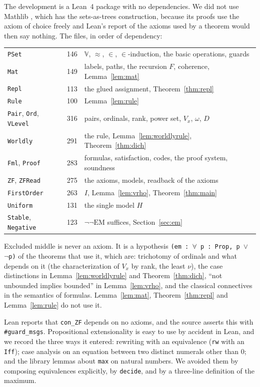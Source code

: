 \documentclass[10pt]{article}
\theoremstyle{definition}
\theoremstyle{remark}
\newcommand{\EM}{\mathrm{EM}}
\newcommand{\V}{\mathbb{V}}
\newcommand{\lean}[1]{\texttt{#1}}
\begin{document}
The development is a Lean~4 package with no dependencies. We did not
use Mathlib \cite{mathlib}, which has the sets-as-trees construction,
because its proofs use the axiom of choice freely and Lean's report of
the axioms used by a theorem would then say nothing. The files, in order
of dependency:
\begin{center}
\begin{tabular}{lrl}
\lean{PSet} & 146 & $\V$, $\approx$, $\in$, $\in$-induction, the basic operations, guards\\
\lean{Mat} & 149 & labels, paths, the recursion $F$, coherence, Lemma~\ref{lem:mat}\\
\lean{Repl} & 113 & the glued assignment, Theorem~\ref{thm:repl}\\
\lean{Rule} & 100 & Lemma~\ref{lem:rule}\\
\lean{Pair}, \lean{Ord}, \lean{VLevel} & 316 & pairs, ordinals, rank, power set, $V_x$, $\omega$, $D$\\
\lean{Worldly} & 291 & the rule, Lemma~\ref{lem:worldlyrule}, Theorem~\ref{thm:dich}\\
\lean{Fml}, \lean{Proof} & 283 & formulas, satisfaction, codes, the proof system, soundness\\
\lean{ZF}, \lean{ZFRead} & 275 & the axioms, models, readback of the axioms\\
\lean{FirstOrder} & 263 & $I$, Lemma~\ref{lem:vrho}, Theorem~\ref{thm:main}\\
\lean{Uniform} & 131 & the single model $H$\\
\lean{Stable}, \lean{Negative} & 123 & $\neg\neg\EM$ suffices, Section~\ref{sec:em}
\end{tabular}
\end{center}
Excluded middle is never an axiom. It is a hypothesis
\lean{(em :\ $\forall$ p :\ Prop, p $\vee$ $\neg$p)} of the theorems that use it, which are:
trichotomy of ordinals and what depends on it (the characterization of
$V_x$ by rank, the least $\nu$), the case distinctions in
Lemma~\ref{lem:worldlyrule} and Theorem~\ref{thm:dich}, ``not unbounded
implies bounded'' in Lemma~\ref{lem:vrho}, and the classical connectives
in the semantics of formulas. Lemma~\ref{lem:mat},
Theorem~\ref{thm:repl} and Lemma~\ref{lem:rule} do not use it.

Lean reports that \lean{con\_ZF} depends on no axioms, and the source
asserts this with \lean{\#guard\_msgs}. Propositional extensionality is easy
to use by accident in Lean, and we record the three ways it entered: rewriting
with an equivalence (\lean{rw} with an \lean{Iff}); case analysis on an
equation between two distinct numerals other than $0$; and the library
lemmas about \lean{max} on natural numbers. We avoided them by
composing equivalences explicitly, by \lean{decide}, and by a
three-line definition of the maximum.
\end{document}
